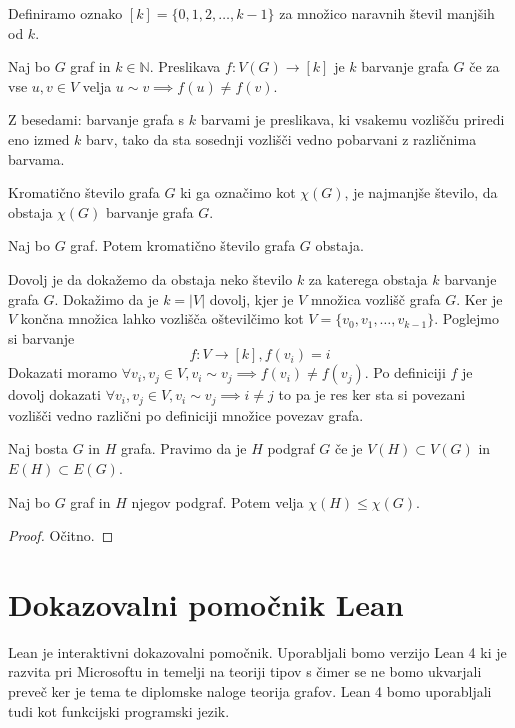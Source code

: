 \documentclass[mat1]{fmfdelo}
\begin{document}
\begin{definicija}
    Definiramo oznako $[k] = \{0, 1, 2, \dots, k-1\}$ za množico naravnih števil manjših od $k$.
\end{definicija}

\begin{definicija}
    Naj bo $G$ graf in $k\in \mathbb{N}$. Preslikava $f:V(G)\to [k]$ je $k$ barvanje grafa $G$ če za vse $u, v\in V$ velja $u\sim v \implies f(u)\neq f(v)$.
\end{definicija}
Z besedami: barvanje grafa s $k$ barvami je preslikava, ki vsakemu vozlišču priredi eno izmed $k$ barv, tako da sta sosednji vozlišči vedno pobarvani z različnima barvama.

\begin{definicija}
    Kromatično število grafa $G$ ki ga označimo kot $\chi(G)$, je najmanjše število, da obstaja $\chi(G)$ barvanje grafa $G$.
\end{definicija}
\begin{lema}
    Naj bo $G$ graf. Potem kromatično število grafa $G$ obstaja.
\end{lema}
\begin{dokaz}
    Dovolj je da dokažemo da obstaja neko število $k$ za katerega obstaja $k$ barvanje grafa $G$.
    Dokažimo da je $k=|V|$ dovolj, kjer je $V$ množica vozlišč grafa $G$. Ker je $V$ končna množica
    lahko vozlišča oštevilčimo kot $V = \{v_0, v_1, \dots, v_{k-1}\}$. Poglejmo si barvanje 
    \[ f:V \to [k], f(v_i) = i\]
    Dokazati moramo $\forall v_i, v_j \in V, v_i \sim v_j\implies f(v_i)\neq f(v_j)$. Po definiciji $f$ je dovolj dokazati
    $\forall v_i, v_j \in V, v_i \sim v_j\implies i\neq j$ to pa je res ker sta si povezani vozlišči vedno različni po definiciji množice
    povezav grafa.
\end{dokaz}

\begin{definicija}
Naj bosta $G$ in $H$ grafa. Pravimo da je $H$ podgraf $G$ če je $V(H)\subset V(G)$ in $E(H)\subset E(G)$.
\end{definicija}
\begin{lema}
    Naj bo $G$ graf in $H$ njegov podgraf. Potem velja $\chi(H)\leq \chi(G)$.
\end{lema}
\begin{proof}
    Očitno.
\end{proof}





\section{Dokazovalni pomočnik Lean}
Lean je interaktivni dokazovalni pomočnik. Uporabljali bomo verzijo Lean 4 ki je razvita pri Microsoftu in temelji na teoriji tipov
s čimer se ne bomo ukvarjali preveč ker je tema te diplomske naloge teorija grafov. Lean 4 bomo uporabljali tudi
kot funkcijski programski jezik. 
\end{document}
